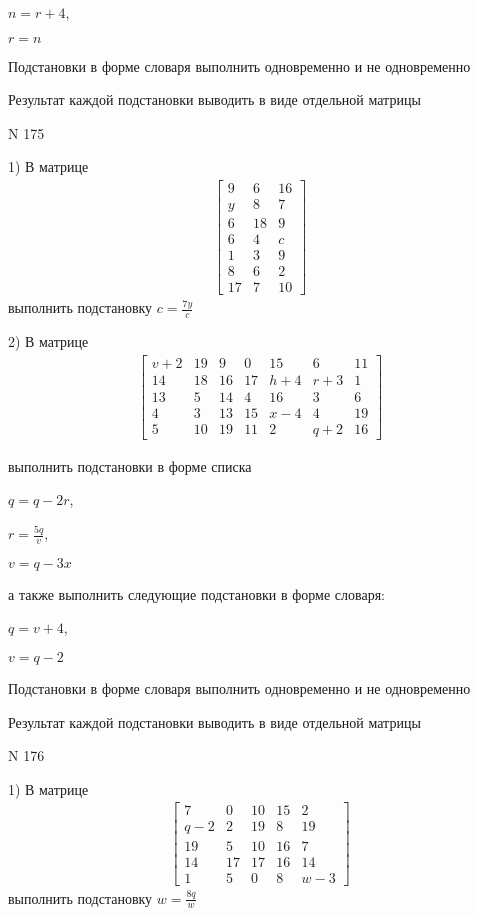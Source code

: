 \documentclass[11pt]{report}
\begin{document}
$n=r + 4$,

$r=n$


    Подстановки в форме словаря выполнить одновременно и не одновременно


    Результат каждой подстановки выводить в виде отдельной матрицы

\newpage
N 175


    1) В матрице
\begin{align*}
\left[\begin{matrix}9 & 6 & 16\\y & 8 & 7\\6 & 18 & 9\\6 & 4 & c\\1 & 3 & 9\\8 & 6 & 2\\17 & 7 & 10\end{matrix}\right]
\end{align*}
выполнить подстановку $c=\frac{7 y}{c}$


    2) В матрице
\begin{align*}
\left[\begin{matrix}v + 2 & 19 & 9 & 0 & 15 & 6 & 11\\14 & 18 & 16 & 17 & h + 4 & r + 3 & 1\\13 & 5 & 14 & 4 & 16 & 3 & 6\\4 & 3 & 13 & 15 & x - 4 & 4 & 19\\5 & 10 & 19 & 11 & 2 & q + 2 & 16\end{matrix}\right]
\end{align*}

выполнить подстановки в форме списка

$q=q - 2 r$,

$r=\frac{5 q}{v}$,

$v=q - 3 x$

а также выполнить следующие подстановки в форме словаря:

$q=v + 4$,

$v=q - 2$


    Подстановки в форме словаря выполнить одновременно и не одновременно


    Результат каждой подстановки выводить в виде отдельной матрицы

\newpage
N 176


    1) В матрице
\begin{align*}
\left[\begin{matrix}7 & 0 & 10 & 15 & 2\\q - 2 & 2 & 19 & 8 & 19\\19 & 5 & 10 & 16 & 7\\14 & 17 & 17 & 16 & 14\\1 & 5 & 0 & 8 & w - 3\end{matrix}\right]
\end{align*}
выполнить подстановку $w=\frac{8 q}{w}$
\end{document}
